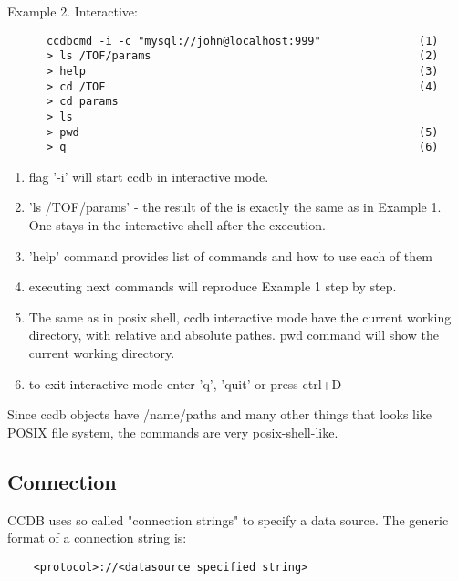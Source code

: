 \documentclass{article}
\begin{document}
Example 2. Interactive:

\begin{verbatim}
      ccdbcmd -i -c "mysql://john@localhost:999"               (1)
      > ls /TOF/params                                         (2)
      > help                                                   (3)
      > cd /TOF                                                (4)
      > cd params
      > ls
      > pwd                                                    (5)
      > q                                                      (6)
\end{verbatim}


\begin{enumerate}
  \item flag '-i'  will start ccdb in interactive mode.

  \item 'ls /TOF/params' - the result of the is exactly the same as in Example 1.
         One stays in the interactive shell after the execution.

  \item 'help' command provides list of commands and how to use each of them

  \item executing next commands will reproduce Example 1 step by step.

  \item  The same as in posix shell, ccdb interactive mode have the current working directory,
         with relative and absolute pathes. pwd command will show the current
         working directory.

  \item to exit interactive mode enter 'q', 'quit' or press ctrl+D
\end{enumerate}

Since ccdb objects have /name/paths and many other things that looks like
POSIX file system, the commands are very posix-shell-like.


\subsection{Connection}\label{sec:connection}


CCDB uses so called "connection strings" to specify a data source.
The generic format of a connection string is:
\begin{verbatim}
    <protocol>://<datasource specified string>
\end{verbatim}
\end{document}
